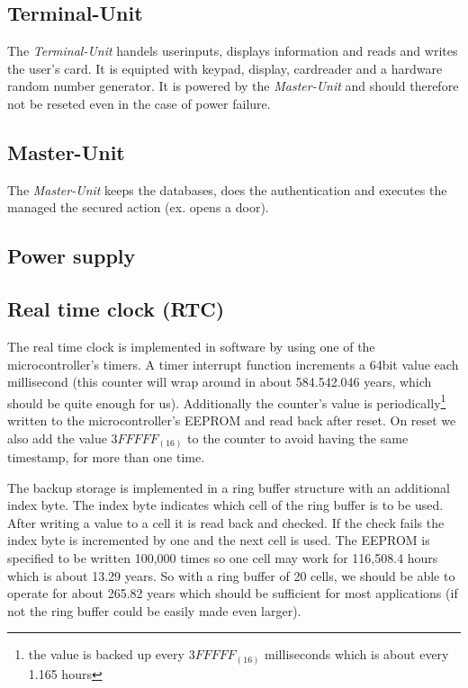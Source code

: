 
\subsection{Terminal-Unit}
The \textit{Terminal-Unit} handels userinputs, displays information and reads and writes the user's card.
It is equipted with keypad, display, cardreader and a hardware random number generator. It is powered by the \textit{Master-Unit} and should therefore not be reseted even in the case of power failure.

\subsection{Master-Unit}
The \textit{Master-Unit} keeps the databases, does the authentication and executes the managed the secured action (ex. opens a door).

\subsection{Power supply}


\subsection{Real time clock (RTC)}
The real time clock is implemented in software by using one of the microcontroller's timers. A timer interrupt function increments a 64bit value each millisecond (this counter will wrap around in about 584.542.046 years, which should be quite enough for us). Additionally the counter's value is periodically\footnote{the value is backed up every $3FFFFF_{(16)}$ milliseconds which is about every 1.165 hours} written to the microcontroller's EEPROM and read back after reset. On reset we also add the value $3FFFFF_{(16)}$ to the counter to avoid having the same timestamp, for more than one time.

The backup storage is implemented in a ring buffer structure with an additional index byte. 
The index byte indicates which cell of the ring buffer is to be used. After writing a value to a cell it is read back and checked. If the check fails the index byte is incremented by one and the next cell is used. The EEPROM is specified to be written 100,000 times so one cell may work for 116,508.4 hours which is about 13.29 years. So with a ring buffer of 20 cells, we should be able to operate for about 265.82 years which should be sufficient for most applications (if not the ring buffer could be easily made even larger).

